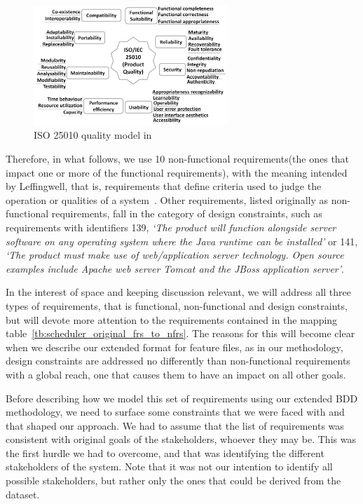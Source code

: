 \documentclass[dissertation,final]{softeng}
\newcommand{\nfrs}{non-functional requirements\xspace}
\begin{document}
\captionsetup[figure]{list=no}
\begin{figure}[h!]
\includegraphics[width=0.65\textwidth]{iso25010}
\centering
\caption[ISO 25010 quality model]{ISO 25010 quality model in ~}
\label{fig:iso25010_again}
\end{figure}
\captionsetup[figure]{list=yes}

Therefore, in what follows, we use 10 \nfrs (the ones that impact one or more of the functional requirements), with the meaning intended by Leffingwell, that is, requirements that define criteria used to judge the operation or qualities of a system~\citep{Leffingwell2011}. Other requirements, listed originally as non-functional requirements, fall in the category of design constraints, such as requirements with identifiers 139, \emph{`The product will function alongside server software on any operating system where the Java runtime can be installed'} or 141, \emph{`The product must make use of web/application server technology. Open source examples include Apache web server Tomcat and the JBoss application server'}. 

In the interest of space and keeping discussion relevant, we will address all three types of requirements, that is functional, non-functional and design constraints, but will devote more attention to the requirements contained in the mapping table~\ref{tb:scheduler_original_frs_to_nfrs}. The reasons for this will become clear when we describe our extended format for feature files, as in our methodology, design constraints are addressed no differently than non-functional requirements with a global reach, one that causes them to have an impact on all other goals.

Before describing how we model this set of requirements using our extended BDD methodology, we need to surface some constraints that we were faced with and that shaped our approach. We had to assume that the list of requirements was consistent with original goals of the stakeholders, whoever they may be. This was the first hurdle we had to overcome, and that was identifying the different stakeholders of the system. Note that it was not our intention to identify all possible stakeholders, but rather only the ones that could be derived from the dataset.
\end{document}
